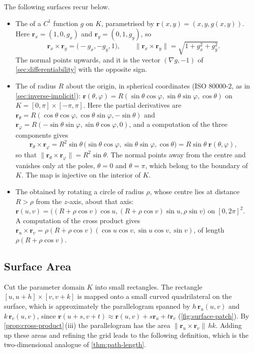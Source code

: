 The following surfaces recur below.
\begin{itemize}
\item The  of a $C^1$ function $g$ on $K$, parametrised by $\mathbf r(x,y)=(x,y,g(x,y))$. Here $\mathbf r_x=(1,0,g_x)$ and $\mathbf r_y=(0,1,g_y)$, so
\[
\mathbf r_x\times\mathbf r_y=\bigl(-g_x,-g_y,1\bigr),\qquad\|\mathbf r_x\times\mathbf r_y\|=\sqrt{1+g_x^2+g_y^2} .
\]
The normal points upwards, and it is the vector $(\nabla g,-1)$ of \cref{sec:differentiability} with the opposite sign.
\item The  of radius $R$ about the origin, in spherical coordinates (ISO 80000-2, as in \cref{sec:inverse-implicit}): $\mathbf r(\theta,\varphi)=R(\sin\theta\cos\varphi,\sin\theta\sin\varphi,\cos\theta)$ on $K=[0,\pi]\times[-\pi,\pi]$. Here the partial derivatives are $\mathbf r_\theta=R(\cos\theta\cos\varphi,\cos\theta\sin\varphi,-\sin\theta)$ and $\mathbf r_\varphi=R(-\sin\theta\sin\varphi,\sin\theta\cos\varphi,0)$, and a computation of the three components gives
\[
\mathbf r_\theta\times\mathbf r_\varphi=R^2\sin\theta\,\bigl(\sin\theta\cos\varphi,\sin\theta\sin\varphi,\cos\theta\bigr)=R\sin\theta\;\mathbf r(\theta,\varphi),
\]
so that $\|\mathbf r_\theta\times\mathbf r_\varphi\|=R^2\sin\theta$.
The normal points away from the centre and vanishes only at the poles, $\theta=0$ and $\theta=\pi$, which belong to the boundary of $K$. The map is injective on the interior of $K$.
\item The  obtained by rotating a circle of radius $\rho$, whose centre lies at distance $R>\rho$ from the $z$-axis, about that axis: $\mathbf r(u,v)=\bigl((R+\rho\cos v)\cos u,(R+\rho\cos v)\sin u,\rho\sin v\bigr)$ on $[0,2\pi]^2$. A computation of the cross product gives $\mathbf r_u\times\mathbf r_v=\rho(R+\rho\cos v)(\cos u\cos v,\sin u\cos v,\sin v)$, of length $\rho(R+\rho\cos v)$.
\end{itemize}

\subsection{Surface Area}

Cut the parameter domain $K$ into small rectangles. The rectangle $[u,u+h]\times[v,v+k]$ is mapped onto a small curved quadrilateral on the surface, which is approximately the parallelogram spanned by $h\,\mathbf r_u(u,v)$ and $k\,\mathbf r_v(u,v)$, since $\mathbf r(u+s,v+t)\approx\mathbf r(u,v)+s\mathbf r_u+t\mathbf r_v$ (\cref{fig:surface-patch}). By \cref{prop:cross-product}\,(iii) the parallelogram has the area $\|\mathbf r_u\times\mathbf r_v\|\,hk$. Adding up these areas and refining the grid leads to the following definition, which is the two-dimensional analogue of \cref{thm:path-length}.

